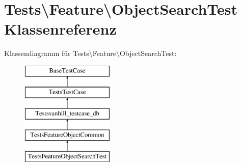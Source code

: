 \hypertarget{classTests_1_1Feature_1_1ObjectSearchTest}{}\section{Tests\textbackslash{}Feature\textbackslash{}Object\+Search\+Test Klassenreferenz}
\label{classTests_1_1Feature_1_1ObjectSearchTest}
Klassendiagramm für Tests\textbackslash{}Feature\textbackslash{}Object\+Search\+Test\+:\begin{figure}[H]
\begin{center}
\leavevmode
\includegraphics[height=5.000000cm]{d6/dd2/classTests_1_1Feature_1_1ObjectSearchTest}
\end{center}
\end{figure}

